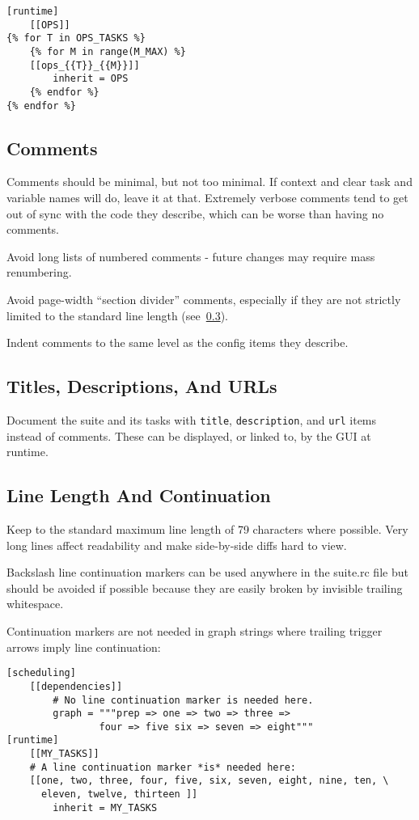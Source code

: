 \lstset{language=suiterc}
\begin{lstlisting}
[runtime]
    [[OPS]]
{% for T in OPS_TASKS %}
    {% for M in range(M_MAX) %}
    [[ops_{{T}}_{{M}}]]
        inherit = OPS
    {% endfor %}
{% endfor %}
\end{lstlisting}

\subsection{Comments}

Comments should be minimal, but not too minimal. If context and clear
task and variable names will do, leave it at that. Extremely verbose comments
tend to get out of sync with the code they describe, which can be worse
than having no comments.

Avoid long lists of numbered comments - future changes may require mass
renumbering.

Avoid page-width ``section divider'' comments, especially if they are not
strictly limited to the standard line length (see~\ref{Line Length}).

Indent comments to the same level as the config items they describe.

\subsection{Titles, Descriptions, And URLs}

Document the suite and its tasks with \lstinline=title=,
\lstinline=description=, and \lstinline=url= items instead of comments. These
can be displayed, or linked to, by the GUI at runtime.

\subsection{Line Length And Continuation}
\label{Line Length}

Keep to the standard maximum line length of 79 characters where possible. Very
long lines affect readability and make side-by-side diffs hard to view.

Backslash line continuation markers can be used anywhere in the suite.rc file
but should be avoided if possible because they are easily broken by invisible
trailing whitespace.

Continuation markers are not needed in graph strings where trailing
trigger arrows imply line continuation:

\lstset{language=suiterc}
\begin{lstlisting}
[scheduling]
    [[dependencies]]
        # No line continuation marker is needed here.
        graph = """prep => one => two => three =>
                four => five six => seven => eight"""
[runtime]
    [[MY_TASKS]]
    # A line continuation marker *is* needed here:
    [[one, two, three, four, five, six, seven, eight, nine, ten, \
      eleven, twelve, thirteen ]]
        inherit = MY_TASKS
\end{lstlisting}

